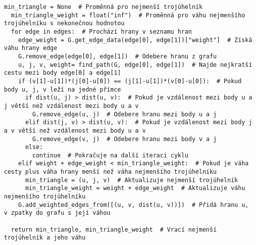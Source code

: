 \begin{lstlisting}[style=metoo]
  min_triangle = None  # Proměnná pro nejmenší trojúhelník
  min_triangle_weight = float("inf")  # Proměnná pro váhu nejmenšího trojúhelníku s nekonečnou hodnotou
  for edge in edges:  # Prochází hrany v seznamu hran
    edge_weight = G.get_edge_data(edge[0], edge[1])["weight"]  # Získá váhu hrany edge
    G.remove_edge(edge[0], edge[1])  # Odebere hranu z grafu
    u, j, v, weight= find_path(G, edge[0], edge[1])  # Najde nejkratší cestu mezi body edge[0] a edge[1]
    if (v[1]-u[1])*(j[0]-u[0]) == (j[1]-u[1])*(v[0]-u[0]):  # Pokud body u, j, v leží na jedné přímce
      if dist(u, j) > dist(u, v):  # Pokud je vzdálenost mezi body u a j větší než vzdálenost mezi body u a v
        G.remove_edge(u, j)  # Odebere hranu mezi body u a j
      elif dist(j, v) > dist(u, v):  # Pokud je vzdálenost mezi body j a v větší než vzdálenost mezi body u a v
        G.remove_edge(v, j)  # Odebere hranu mezi body v a j
      else:
        continue  # Pokračuje na další iteraci cyklu
    elif weight + edge_weight < min_triangle_weight:  # Pokud je váha cesty plus váha hrany menší než váha nejmenšího trojúhelníku
      min_triangle = (u, j, v)  # Aktualizuje nejmenší trojúhelník
      min_triangle_weight = weight + edge_weight  # Aktualizuje váhu nejmenšího trojúhelníku
    G.add_weighted_edges_from([(u, v, dist(u, v))])  # Přidá hranu u, v zpatky do grafu s její váhou

  return min_triangle, min_triangle_weight  # Vrací nejmenší trojúhelník a jeho váhu
\end{lstlisting}